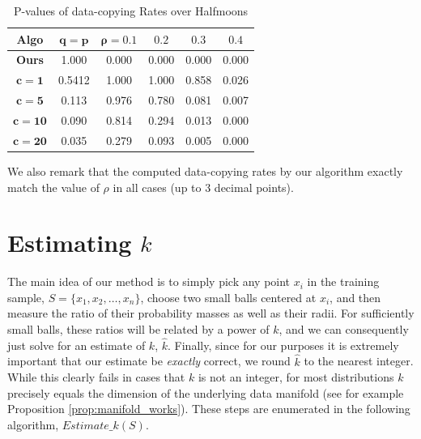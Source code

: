 \begin{table}[h]
\caption{P-values of data-copying Rates over Halfmoons} \label{results:full}
\begin{center}
\begin{tabular}{ |c||c|c|c|c|c| } 
 \hline
 \textbf{Algo} & $\mathbf{q = p}$ & $\mathbf{\rho = 0.1}$ & $\mathbf{0.2}$ & $\mathbf{0.3}$ & $\mathbf{0.4}$ \\ 
 \hline
 \hline
 \textbf{Ours} & \color{blue}1.000 & \color{red}0.000 & \color{red}0.000 & \color{red}0.000 & \color{red}0.000 \\ 
 \hline
 $\mathbf{c=1}$ & \color{blue}0.5412 & \color{blue}1.000 & \color{blue}1.000 & \color{blue}0.858 & \color{blue}0.026 \\ 
 \hline
 $\mathbf{c=5}$ & \color{blue}0.113 & \color{blue}0.976 & \color{blue}0.780 & \color{blue}0.081 & \color{red}0.007 \\ 
 \hline
 $\mathbf{c=10}$ & \color{blue}0.090 & \color{blue}0.814 & \color{blue}0.294 & \color{blue}0.013 & \color{red}0.000 \\ 
 \hline
 $\mathbf{c=20}$ & \color{blue}0.035 & \color{blue}0.279& \color{blue}0.093 & \color{red}0.005 & \color{red}0.000\\ 
 \hline
\end{tabular}
\end{center}
\end{table}

We also remark that the computed data-copying rates by our algorithm exactly match the value of $\rho$ in all cases (up to 3 decimal points).

\section{Estimating $k$}\label{sec:estimating_alpha}

The main idea of our method is to simply pick any point $x_i$ in the training sample, $S = \{x_1, x_2, \dots, x_n\}$, choose two small balls centered at $x_i$, and then measure the ratio of their probability masses as well as their radii. For sufficiently small balls, these ratios will be related by a power of $k$, and we can consequently just solve for an estimate of $k$, $\hat{k}$. Finally, since for our purposes it is extremely important that our estimate be \textit{exactly} correct, we round $\hat{k}$ to the nearest integer. While this clearly fails in cases that $k$ is not an integer, for most distributions $k$ precisely equals the dimension of the underlying data manifold (see for example Proposition \ref{prop:manifold_works}). These steps are enumerated in the following algorithm, $Estimate\_k(S)$. 

